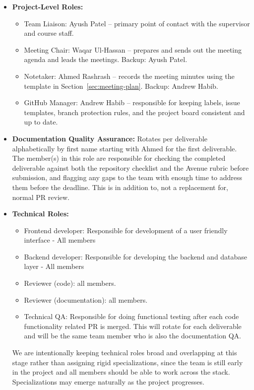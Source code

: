\documentclass{article}
\begin{document}
\begin{itemize}
    \item \textbf{Project-Level Roles:}
          \begin{itemize}
              \item Team Liaison: Ayush Patel -- primary point of contact with
                    the supervisor and course staff.
              \item Meeting Chair: Waqar Ul-Hassan -- prepares and sends out
                    the meeting agenda and leads the meetings. Backup:
                    Ayush Patel.
              \item Notetaker: Ahmed Rashrash -- records the meeting minutes
                    using the template in Section~\ref{sec:meeting-plan}.
                    Backup: Andrew Habib.
              \item GitHub Manager: Andrew Habib -- responsible for keeping
                    labels, issue templates, branch protection rules, and the
                    project board consistent and up to date.
          \end{itemize}

    \item \textbf{Documentation Quality Assurance:} Rotates per deliverable alphabetically by first name starting with Ahmed for the first deliverable.
          The member(s) in this role are responsible for checking the completed deliverable against both the repository checklist and the Avenue rubric before submission, and flagging any gaps to the team with enough time to address them before the deadline.
          This is in addition to, not a replacement for, normal PR review.

    \item \textbf{Technical Roles:}
          \begin{itemize}
              \item Frontend developer: Responsible for development of a user
                    friendly interface - All members
              \item Backend developer: Responsible for developing the backend
                    and database layer - All members
              \item Reviewer (code): all members.
              \item Reviewer (documentation): all members.
              \item Technical QA: Responsible for doing functional testing
                    after each code functionality related PR is merged. This
                    will rotate for each deliverable and will be the same team
                    member who is also the documentation QA.
          \end{itemize}
          We are intentionally keeping technical roles broad and overlapping at this stage rather than assigning rigid specializations, since the team is still early in the project and all members should be able to work across the stack.
          Specializations may emerge naturally as the project progresses.


\end{itemize}
\end{document}
